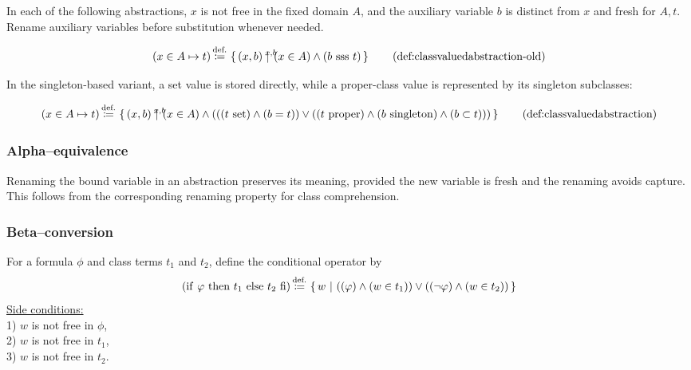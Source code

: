 In each of the following abstractions, $x$ is not free in the fixed domain $A$,
and the auxiliary variable $b$ is distinct from $x$ and fresh for $A,t$.
Rename auxiliary variables before substitution whenever needed.

\begin{definition}
\[
(x\in A \mapsto t)
\eqdef
\ccc{x,b}{(x,b)}{(x\in A)\land (b \sss t)}
\clabeltagd{def}{classvaluedabstraction-old}
\]
\end{definition}
In the singleton-based variant, a set value is stored directly, while
a proper-class value is represented by its singleton subclasses:
\begin{definition}
\[
(x\in A \mapsto t)
\eqdef
\ccc{x,b}{(x,b)}{
(x\in A)\land
(
((t\set)\land(b=t))
\lor
((t\proper)\land(b\singleton)\land(b\subset t))
)
}
\clabeltagd{def}{classvaluedabstraction}
\]
\end{definition}

\subsubsection{Alpha--equivalence}

Renaming the bound variable in an abstraction preserves its meaning,
provided the new variable is fresh and the renaming avoids capture.
This follows from the corresponding renaming property for class
comprehension.

\subsubsection{Beta--conversion}
\begin{definition}
For a formula $\phi$ and class terms $t_1$ and $t_2$, define the
conditional operator by
\[
(\mathrm{if}\ \varphi\ \mathrm{then}\ t_1\ \mathrm{else}\ t_2\ \mathrm{fi})
\,{\stackrel{{\textrm{def.}}}{\coloneqq}}\,
\left\{\,w\ \middle|\ ((\varphi)\land(w\in t_1))\lor((\neg\varphi)\land(w\in t_2))\,\right\}
\]
\underline{Side conditions:}\\
1) $w$ is not free in $\phi$,\\
2) $w$ is not free in $t_1$,\\
3) $w$ is not free in $t_2$.
\end{definition}


